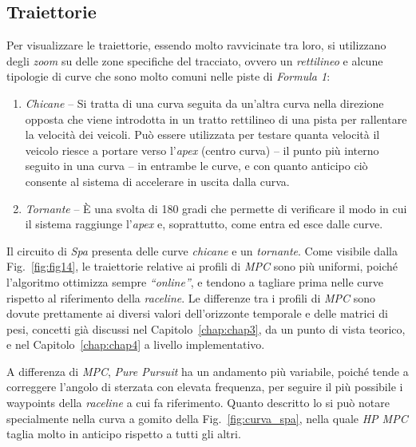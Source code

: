 \subsection{Traiettorie}
Per visualizzare le traiettorie, essendo molto ravvicinate tra loro, si utilizzano degli
\textit{zoom} su delle zone specifiche del tracciato, ovvero un \textit{rettilineo} e 
alcune tipologie di curve che sono molto comuni nelle piste di \textit{Formula 1}:
\begin{enumerate}
    \item \textit{Chicane} -- Si tratta di una curva seguita da un'altra 
    curva nella direzione opposta che viene introdotta in un tratto 
    rettilineo di una pista per rallentare la velocità dei veicoli. 
    Può essere utilizzata per testare quanta velocità il veicolo riesce a portare verso 
    l'\textit{apex} (centro curva) -- il punto più interno seguito in una curva -- in entrambe le 
    curve, e con quanto anticipo ciò consente al sistema di accelerare in uscita dalla curva.
    \item \textit{Tornante} -- È una svolta di 180 gradi che permette di verificare il modo in cui 
    il sistema raggiunge l'\textit{apex} e, soprattutto, come entra ed esce dalle curve.
\end{enumerate}
Il circuito di \textit{Spa} presenta delle curve \textit{chicane} e un 
\textit{tornante}. Come visibile dalla Fig.~\ref{fig:fig14}, le traiettorie 
relative ai profili di \textit{MPC} sono più uniformi, poiché l'algoritmo ottimizza
sempre \textit{``online''}, e tendono a tagliare prima nelle curve rispetto al riferimento della 
\textit{raceline}. Le differenze tra i profili di \textit{MPC} sono dovute prettamente ai diversi
valori dell'orizzonte temporale e delle matrici di pesi, concetti già discussi nel 
Capitolo~\ref{chap:chap3}, da un punto di vista teorico, e nel Capitolo~\ref{chap:chap4} a livello implementativo.

A differenza di \textit{MPC}, \textit{Pure Pursuit} ha un andamento 
più variabile, poiché tende a correggere l'angolo di sterzata con elevata frequenza, per seguire
il più possibile i waypoints della \textit{raceline} a cui fa riferimento. 
Quanto descritto lo si può notare specialmente nella curva a gomito della 
Fig.~\ref{fig:curva_spa}, nella quale \textit{HP MPC} taglia molto in anticipo rispetto a tutti gli altri.

